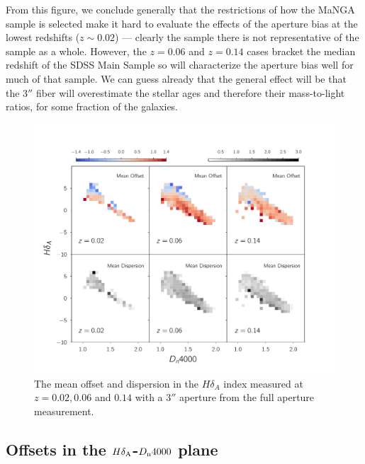From this figure, we conclude generally that the restrictions of
how the MaNGA sample is selected make it hard to evaluate the effects 
of the aperture bias at the lowest redshifts ($z\sim 0.02$) --- 
clearly the sample there is not representative of the sample as a whole.
However, the $z=0.06$ and $z=0.14$ cases bracket the median redshift of the 
SDSS Main Sample so will characterize the aperture bias well for much
of that sample. We can guess already that the general effect will be that
the $3''$ fiber will overestimate the stellar ages and therefore their 
mass-to-light ratios, for some fraction of the galaxies.

\begin{figure}
\includegraphics[width=\textwidth]{figures/hdelta_full_aperture_comparisons.pdf}
\caption[The mean offset and dispersion in the $H\delta_{A}$
 index measured at $z = 0.02,0.06$ and $0.14$ with a $3''$ 
 aperture from the full aperture measurement ]
 {The mean offset and dispersion in the $H\delta_{A}$ 
 index measured at $z = 0.02,0.06$ and $0.14$ 
 with a $3''$ aperture from the full aperture measurement.
\label{fig:offset_hdelta}}
\end{figure}


\subsection{Offsets in the $H\delta_{\rm A}$-$D_{\rm n}4000$ plane}

